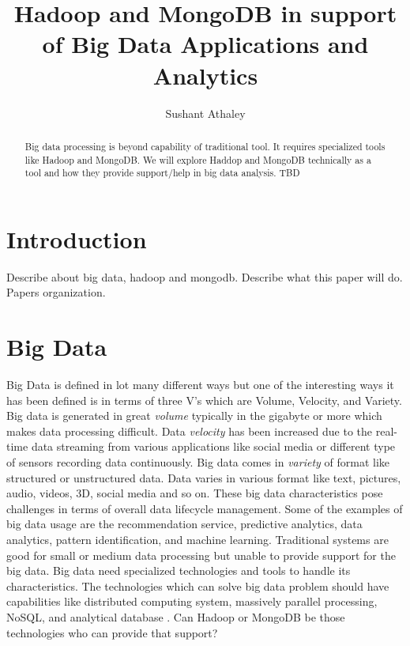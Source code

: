 \documentclass[sigconf]{acmart}
\begin{document}
\title{Hadoop and MongoDB in support of Big Data Applications and Analytics}


\author{Sushant Athaley}

\renewcommand{\shortauthors}{G. v. Laszewski}


\begin{abstract}
Big data processing is beyond capability of traditional tool. It requires specialized tools like Hadoop and MongoDB. We will explore Haddop and MongoDB technically as a tool and how they provide support/help in big data analysis.
TBD
\end{abstract}



\maketitle


\section{Introduction}

Describe about big data, hadoop and mongodb. Describe what this paper will do.
Papers organization.

\section{Big Data}
Big Data is defined in lot many different ways but one of the interesting ways it has been defined is in terms of three V's which are Volume, Velocity, and Variety. Big data is generated in great \emph{volume} typically in the gigabyte or more which makes data processing difficult. Data \emph{velocity} has been increased due to the real-time data streaming from various applications like social media or different type of sensors recording data continuously. Big data comes in \emph{variety} of format like structured or unstructured data. Data varies in various format like text, pictures, audio, videos, 3D, social media and so on. These big data characteristics pose challenges in terms of overall data lifecycle management. Some of the examples of big data usage are the recommendation service, predictive analytics, data analytics, pattern identification, and machine learning. Traditional systems are good for small or medium data processing but unable to provide support for the big data. Big data need specialized technologies and tools to handle its characteristics. The technologies which can solve big data problem should have capabilities like distributed computing system, massively parallel processing, NoSQL, and analytical database \cite[Ch.\ 1, p. 4]{AchariShiva2015HE}. Can Hadoop or MongoDB be those technologies who can provide that support?  
\end{document}
